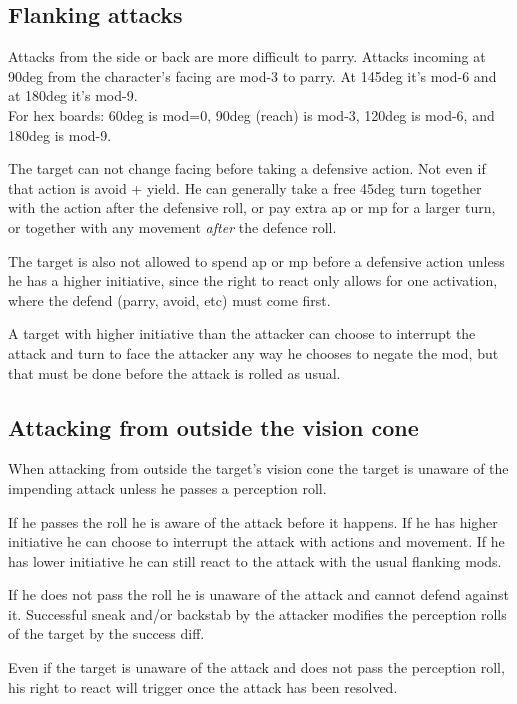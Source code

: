 \subsection*{Flanking attacks}
Attacks from the side or back are more difficult to parry. Attacks incoming at 90deg from the character's facing are mod-3 to parry. At 145deg it's mod-6 and at 180deg it's mod-9.\\
For hex boards: 60deg is mod=0, 90deg (reach) is mod-3, 120deg is mod-6, and 180deg is mod-9.

The target can not change facing before taking a defensive action. Not even if that action is avoid + yield. He can generally take a free 45deg turn together with the action after the defensive roll, or pay extra ap or mp for a larger turn, or together with any movement \emph{after} the defence roll.

The target is also not allowed to spend ap or mp before a defensive action unless he has a higher initiative, since the right to react only allows for one activation, where the defend (parry, avoid, etc) must come first.

A target with higher initiative than the attacker can choose to interrupt the attack and turn to face the attacker any way he chooses to negate the mod, but that must be done before the attack is rolled as usual.


\subsection*{Attacking from outside the vision cone}
When attacking from outside the target's vision cone the target is unaware of the impending attack unless he passes a perception roll.

If he passes the roll he is aware of the attack before it happens. If he has higher initiative he can choose to interrupt the attack with actions and movement. If he has lower initiative he can still react to the attack with the usual flanking mods.

If he does not pass the roll he is unaware of the attack and cannot defend against it. Successful sneak and/or backstab by the attacker modifies the perception rolls of the target by the success diff.

Even if the target is unaware of the attack and does not pass the perception roll, his right to react will trigger once the attack has been resolved.


